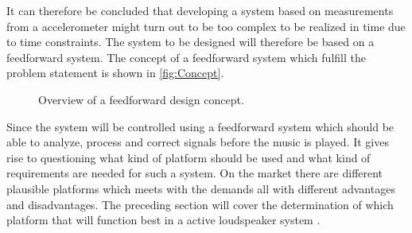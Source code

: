 It can therefore be concluded that developing a system based on measurements from a accelerometer might turn out to be too complex to be realized in time due to time constraints. The system to be designed will therefore be based on a feedforward system. The concept of a feedforward system which fulfill the problem statement is shown in \autoref{fig:Concept}.

\begin{figure}[H]
\centering
{}
\scalebox{0.8}{
}
\caption{Overview of a feedforward design concept.}
\label{fig:Concept}
\end{figure}

Since the system will be controlled using a feedforward system which should be able to analyze, process and correct signals before the music is played. It gives rise to questioning what kind of platform should be used and what kind of requirements are needed for such a system. On the market there are different plausible platforms which meets with the demands all with different advantages and disadvantages. The preceding section will cover the determination of which platform that will function best in a active loudspeaker system . 

